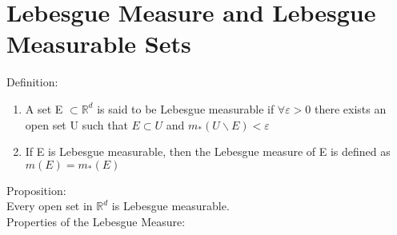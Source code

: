 \documentclass{article}[12 pt]
\begin{document}
\section{Lebesgue Measure and Lebesgue Measurable Sets}
Definition:\\
\begin{enumerate}
	\item A set E $\subset \mathbb{R}^d$ is said to be Lebesgue measurable if $\forall \varepsilon > 0$ there exists an open set U such that $E \subset U$ and $m_{*}(U\backslash E) < \varepsilon$\\
	\item If E is Lebesgue measurable, then the Lebesgue measure of E is defined as $m(E) = m_{*}(E)$
\end{enumerate}
Proposition:\\
Every open set in $\mathbb{R}^d$ is Lebesgue measurable.\\
Properties of the Lebesgue Measure:
\end{document}
